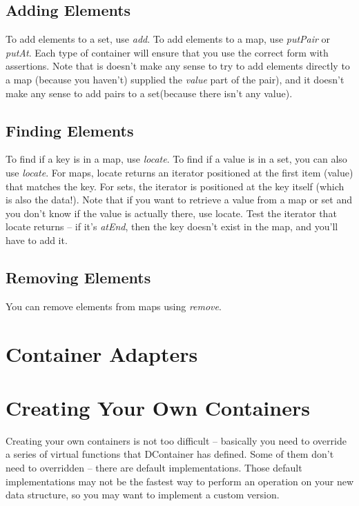 \documentclass{report}
\begin{document}
\subsection{Adding Elements}

To add elements to a set, use \emph{add}. To add elements to a map, use
\emph{putPair} or \emph{putAt}. Each type of container will ensure that you
use the correct form with assertions. Note that is doesn't make any sense to
try to add elements directly to a map (because you haven't) supplied the
\emph{value} part of the pair), and it doesn't make any sense to add pairs
to a set(because there isn't any value).

\subsection{Finding Elements}

To find if a key is in a map, use \emph{locate}. To find if a value is in a
set, you can also use \emph{locate}. For maps, locate returns an iterator
positioned at the first item (value) that matches the key. For sets, the
iterator is positioned at the key itself (which is also the data!). Note
that if you want to retrieve a value from a map or set and you don't know if
the value is actually there, use locate. Test the iterator that locate
returns -- if it's \emph{atEnd}, then the key doesn't exist in the map, and
you'll have to add it.

\subsection{Removing Elements}

You can remove elements from maps using \emph{remove}.

\section{Container Adapters}

\section{Creating Your Own Containers}

Creating your own containers is not too difficult -- basically you need to
override a series of virtual functions that DContainer has defined. Some of
them don't need to overridden -- there are default implementations. Those
default implementations may not be the fastest way to perform an operation
on your new data structure, so you may want to implement a custom version.
\end{document}
